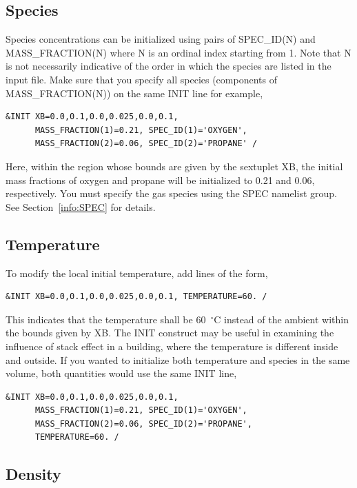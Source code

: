\documentclass[11pt]{book}
\begin{document}
\subsection*{Species}

Species concentrations can be initialized using pairs of {\ct SPEC\_ID(N)} and {\ct MASS\_FRACTION(N)} where {\ct N} is an ordinal index starting from 1. Note that {\ct N} is not necessarily indicative of the order in which the species are listed in the input file.
Make sure that you specify all species (components of {\ct MASS\_FRACTION(N)}) on the same {\ct INIT} line for example,
\begin{lstlisting}
&INIT XB=0.0,0.1,0.0,0.025,0.0,0.1,
      MASS_FRACTION(1)=0.21, SPEC_ID(1)='OXYGEN',
      MASS_FRACTION(2)=0.06, SPEC_ID(2)='PROPANE' /
\end{lstlisting}
Here, within the region whose bounds are given by the sextuplet {\ct XB}, the initial mass fractions of oxygen and propane will be initialized to 0.21 and 0.06, respectively. You must specify the gas species using the {\ct SPEC} namelist group. See Section~\ref{info:SPEC} for details.

\subsection*{Temperature}

To modify the local initial temperature, add lines of the form,
\begin{lstlisting}
&INIT XB=0.0,0.1,0.0,0.025,0.0,0.1, TEMPERATURE=60. /
\end{lstlisting}
This indicates that the temperature shall be 60~$^\circ$C instead of the ambient within the bounds given by {\ct XB}. The {\ct INIT} construct may be useful in examining the influence of stack effect in a building, where the temperature is different inside and outside. If you wanted to initialize both temperature and species in the same volume, both quantities would use the same {\ct INIT} line,
\begin{lstlisting}
&INIT XB=0.0,0.1,0.0,0.025,0.0,0.1,
      MASS_FRACTION(1)=0.21, SPEC_ID(1)='OXYGEN',
      MASS_FRACTION(2)=0.06, SPEC_ID(2)='PROPANE',
      TEMPERATURE=60. /
\end{lstlisting}

\subsection*{Density}
\end{document}
